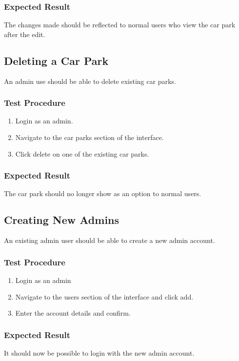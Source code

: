 \documentclass[a4paper, draft]{article}
\begin{document}
\subsubsection{Expected Result}
The changes made should be reflected to normal users who view the car park after the edit.

\subsection{Deleting a Car Park}
An admin use should be able to delete existing car parks.

\subsubsection{Test Procedure}
\begin{enumerate}
    \item Login as an admin.
    \item Navigate to the car parks section of the interface.
    \item Click delete on one of the existing car parks.
\end{enumerate}

\subsubsection{Expected Result}
The car park should no longer show as an option to normal users.

\subsection{Creating New Admins}
An existing admin user should be able to create a new admin account.

\subsubsection{Test Procedure}
\begin{enumerate}
    \item Login as an admin
    \item Navigate to the users section of the interface and click add.
    \item Enter the account details and confirm.
\end{enumerate}

\subsubsection{Expected Result}
It should now be possible to login with the new admin account.
\end{document}
